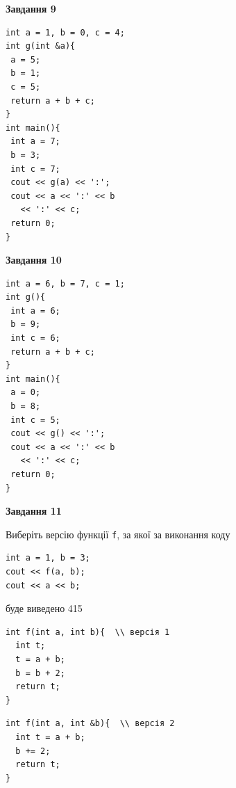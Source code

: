 \documentclass[12pt, ukrainian]{article}
\def\code#1{\Verb!#1!}
\begin{document}
{\begin {large}
\begin{minipage}[t]{11.0cm}
\end{minipage}


\begin{minipage}[t]{7.0cm}

\begin{center}
\textbf{Завдання 9}
\end{center}
\vspace{-8mm}

\begin{verbatim}
int a = 1, b = 0, c = 4;
int g(int &a){
 a = 5;
 b = 1;
 c = 5;
 return a + b + c;
}
int main(){
 int a = 7;
 b = 3;
 int c = 7;
 cout << g(a) << ':';
 cout << a << ':' << b 
   << ':' << c;
 return 0;
}
\end{verbatim}



\begin{center}
\textbf{Завдання 10}
\end{center}
\vspace{-8mm}

\begin{verbatim}
int a = 6, b = 7, c = 1;
int g(){
 int a = 6;
 b = 9;
 int c = 6;
 return a + b + c;
}
int main(){
 a = 0;
 b = 8;
 int c = 5;
 cout << g() << ':';
 cout << a << ':' << b 
   << ':' << c;
 return 0;
}
\end{verbatim}

\end{minipage}
\vline \hspace{1mm}
\begin{minipage}[t]{11.0cm}

\begin{center}
\textbf{Завдання 11}
\end{center}
Виберіть версію функції \code{f}, за якої за виконання коду
\begin{verbatim}
int a = 1, b = 3;
cout << f(a, b);
cout << a << b;
\end{verbatim}

буде виведено 415

\begin{verbatim}
int f(int a, int b){  \\ версія 1
  int t;
  t = a + b;
  b = b + 2;
  return t;
}
\end{verbatim}

\vspace{-8mm}\begin{verbatim}
int f(int a, int &b){  \\ версія 2
  int t = a + b;
  b += 2;
  return t;
}
\end{verbatim}


\end{minipage}
\end{large}}
\end{document}

